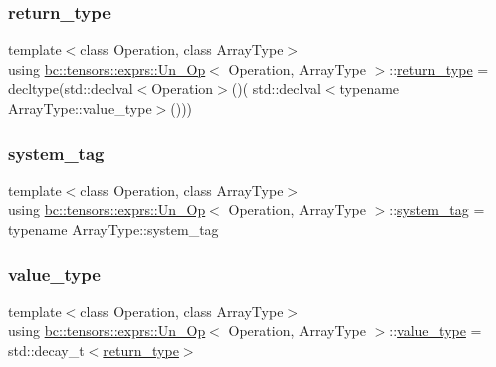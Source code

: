 \subsubsection{\texorpdfstring{return\+\_\+type}{return\_type}}
{\footnotesize\ttfamily template$<$class Operation, class Array\+Type$>$ \\
using \hyperlink{structbc_1_1tensors_1_1exprs_1_1Un__Op}{bc\+::tensors\+::exprs\+::\+Un\+\_\+\+Op}$<$ Operation, Array\+Type $>$\+::\hyperlink{structbc_1_1tensors_1_1exprs_1_1Un__Op_aabfd9e86607b84279553abb4a02dc0d0}{return\+\_\+type} =  decltype(std\+::declval$<$Operation$>$()( std\+::declval$<$typename Array\+Type\+::value\+\_\+type$>$()))}

\mbox{\label{structbc_1_1tensors_1_1exprs_1_1Un__Op_abd1390e4fcf0a46b7c2f20a15bb82ec1}} 
\subsubsection{\texorpdfstring{system\+\_\+tag}{system\_tag}}
{\footnotesize\ttfamily template$<$class Operation, class Array\+Type$>$ \\
using \hyperlink{structbc_1_1tensors_1_1exprs_1_1Un__Op}{bc\+::tensors\+::exprs\+::\+Un\+\_\+\+Op}$<$ Operation, Array\+Type $>$\+::\hyperlink{structbc_1_1tensors_1_1exprs_1_1Un__Op_abd1390e4fcf0a46b7c2f20a15bb82ec1}{system\+\_\+tag} =  typename Array\+Type\+::system\+\_\+tag}

\mbox{\label{structbc_1_1tensors_1_1exprs_1_1Un__Op_a8c87b36ec972937cd789e6517fb47369}} 
\subsubsection{\texorpdfstring{value\+\_\+type}{value\_type}}
{\footnotesize\ttfamily template$<$class Operation, class Array\+Type$>$ \\
using \hyperlink{structbc_1_1tensors_1_1exprs_1_1Un__Op}{bc\+::tensors\+::exprs\+::\+Un\+\_\+\+Op}$<$ Operation, Array\+Type $>$\+::\hyperlink{structbc_1_1tensors_1_1exprs_1_1Un__Op_a8c87b36ec972937cd789e6517fb47369}{value\+\_\+type} =  std\+::decay\+\_\+t$<$\hyperlink{structbc_1_1tensors_1_1exprs_1_1Un__Op_aabfd9e86607b84279553abb4a02dc0d0}{return\+\_\+type}$>$}



